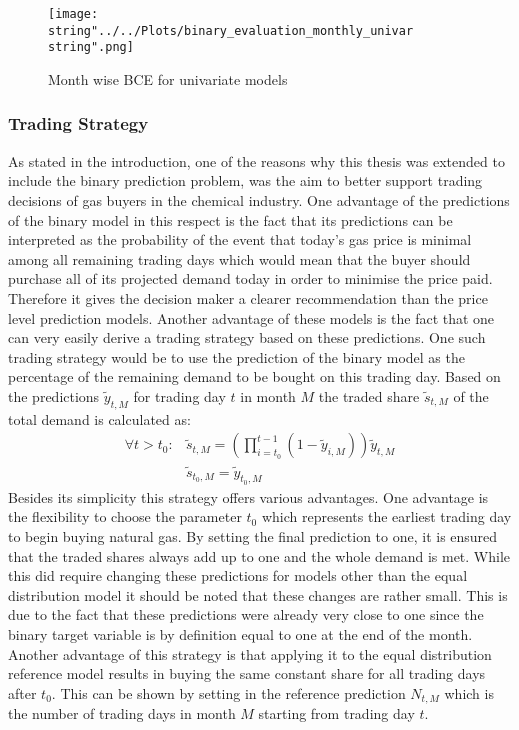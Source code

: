 \begin{figure}[h!]
  \centering
\texttt{[image: \\string"../../Plots/binary\_evaluation\_monthly\_univar\\string".png]}
  \caption{Month wise BCE for univariate models}\label{fig:binary_evaluation_monthly_univar}
\end{figure}

\subsubsection{Trading Strategy}
As stated in the introduction, one of the reasons why this thesis was extended to include the binary prediction problem, was the aim to better support trading decisions of gas buyers in the chemical industry. One advantage of the predictions of the binary model in this respect is the fact that its predictions can be interpreted as the probability of the event that today's gas price is minimal among all remaining trading days which would mean that the buyer should purchase all of its projected demand today in order to minimise the price paid. Therefore it gives the decision maker a clearer recommendation than the price level prediction models. Another advantage of these models is the fact that one can very easily derive a trading strategy based on these predictions.
One such trading strategy would be to use the prediction of the binary model as the percentage of the remaining demand to be bought on this trading day. Based on the predictions $\tilde{y}_{t,M}$ for 
trading day $t$ in month $M$ the traded share $\tilde{s}_{t,M}$ of the total demand is calculated as:
\begin{align*}
\forall t > t_0: &\tilde{s}_{t,M} = (\prod_{i = t_{0}}^{t-1}(1-\tilde{y}_{i,M}))\tilde{y}_{t,M}\\
&\tilde{s}_{t_0,M} = \tilde{y}_{t_0,M}
\end{align*}
Besides its simplicity this strategy offers various advantages. One advantage is the flexibility to choose the parameter $t_0$ which represents the earliest trading day to begin buying natural gas. By setting the final prediction to one, it is ensured that the traded shares always add up to one and the whole demand is met. While this did require changing these predictions for models other than the equal distribution model it should be noted that these changes are rather small. This is due to the fact that these predictions were already very close to one since the binary target variable is by definition equal to one at the end of the month. Another advantage of this strategy is that applying it to the equal distribution reference model results in buying the same constant share for all trading days after $t_0$. This can be shown by setting in the reference prediction $N_{t,M}$ which is the number of trading days in month $M$ starting from trading day $t$.

